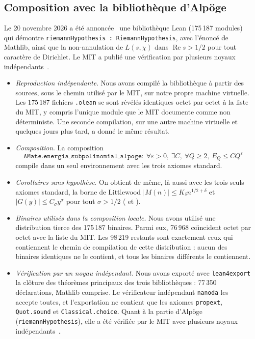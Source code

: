 \documentclass[11pt,a4paper]{amsart}
\theoremstyle{definition}
\theoremstyle{remark}
\renewcommand{\Re}{\operatorname{Re}}
\begin{document}
\subsection*{Composition avec la biblioth\`eque d'Alp\"oge}
Le 20 novembre 2026 a \'et\'e annonc\'ee~\cite{Alpoge} une biblioth\`eque Lean (175\,187 modules) qui d\'emontre \texttt{riemannHypothesis : RiemannHypothesis}, avec l'\'enonc\'e de Mathlib, ainsi que la non-annulation de $L(s,\chi)$ dans $\Re s>1/2$ pour tout caract\`ere de Dirichlet. Le MIT a publi\'e une v\'erification par plusieurs noyaux ind\'ependants~\cite{MIT}.
\begin{itemize}
\item \emph{Reproduction ind\'ependante.} Nous avons compil\'e la biblioth\`eque \`a partir des sources, sous le chemin utilis\'e par le MIT, sur notre propre machine virtuelle. Les 175\,187 fichiers \texttt{.olean} se sont r\'ev\'el\'es identiques octet par octet \`a la liste du MIT, y compris l'unique module que le MIT documente comme non d\'eterministe. Une seconde compilation, sur une autre machine virtuelle et quelques jours plus tard, a donn\'e le m\^eme r\'esultat.
\item \emph{Composition.} La composition
\[
\texttt{AMate.energia\_subpolinomial\_alpoge}:\ \forall\varepsilon>0,\ \exists C,\ \forall Q\ge2,\ E_Q\le CQ^\varepsilon
\]
compile dans un seul environnement avec les trois axiomes standard.
\item \emph{Corollaires sans hypoth\`ese.} On obtient de m\^eme, l\`a aussi avec les trois seuls axiomes standard, la borne de Littlewood $|M(n)|\le K_\delta n^{1/2+\delta}$ et $|G(y)|\le C_{\sigma}y^{\sigma}$ pour tout $\sigma>1/2$ ( et ).
\item \emph{Binaires utilis\'es dans la composition locale.} Nous avons utilis\'e une distribution tierce des 175\,187 binaires. Parmi eux, 76\,968 co\"{\i}ncident octet par octet avec la liste du MIT. Les 98\,219 restants sont exactement ceux qui contiennent le chemin de compilation de cette distribution : aucun des binaires identiques ne le contient, et tous les binaires diff\'erents le contiennent.
\item \emph{V\'erification par un noyau ind\'ependant.} Nous avons export\'e avec \texttt{lean4export} la cl\^oture des th\'eor\`emes principaux des trois biblioth\`eques : 77\,350 d\'eclarations, Mathlib comprise. Le v\'erificateur ind\'ependant \texttt{nanoda} les accepte toutes, et l'exportation ne contient que les axiomes \texttt{propext}, \texttt{Quot.sound} et \texttt{Classical.choice}. Quant \`a la partie d'Alp\"oge (\texttt{riemannHypothesis}), elle a \'et\'e v\'erifi\'ee par le MIT avec plusieurs noyaux ind\'ependants~\cite{MIT}.
\end{itemize}
\end{document}
